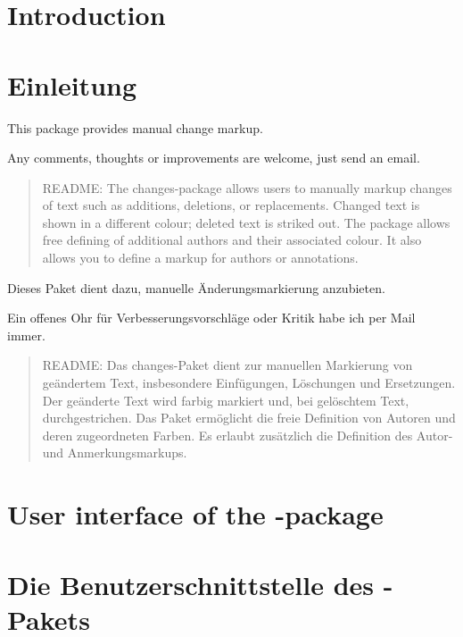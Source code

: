 
\ifENGLISH
	\section{Introduction}
\fi
	\ifGERMAN
		\section{Einleitung}
	\fi

\ifENGLISH
	This package provides manual change markup.

	Any comments, thoughts or improvements are welcome, just send an email.

	\begin{quote}
		\small\textsc{README:}
		The changes-package allows users to manually markup changes of text such as additions, deletions, or replacements.
		Changed text is shown in a different colour; deleted text is striked out.
		The package allows free defining of additional authors and their associated colour.
		It also allows you to define a markup for authors or annotations.
	\end{quote}
\fi
	\ifGERMAN
		Dieses Paket dient dazu, manuelle Änderungsmarkierung anzubieten.

		Ein offenes Ohr für Verbesserungsvorschläge oder Kritik habe ich per Mail immer.

		\begin{quote}
			\small\textsc{README:}
			Das changes-Paket dient zur manuellen Markierung von geändertem Text, insbesondere Einfügungen, Löschungen und Ersetzungen.
			Der geänderte Text wird farbig markiert und, bei gelöschtem Text, durchgestrichen.
			Das Paket ermöglicht die freie Definition von Autoren und deren zugeordneten Farben.
			Es erlaubt zusätzlich die Definition des Autor- und Anmerkungsmarkups.
		\end{quote}
	\fi


\ifENGLISH
	\section{User interface of the -package}
\fi
	\ifGERMAN
		\section{Die Benutzerschnittstelle des -Pakets}
	\fi
\label{sec:user}


